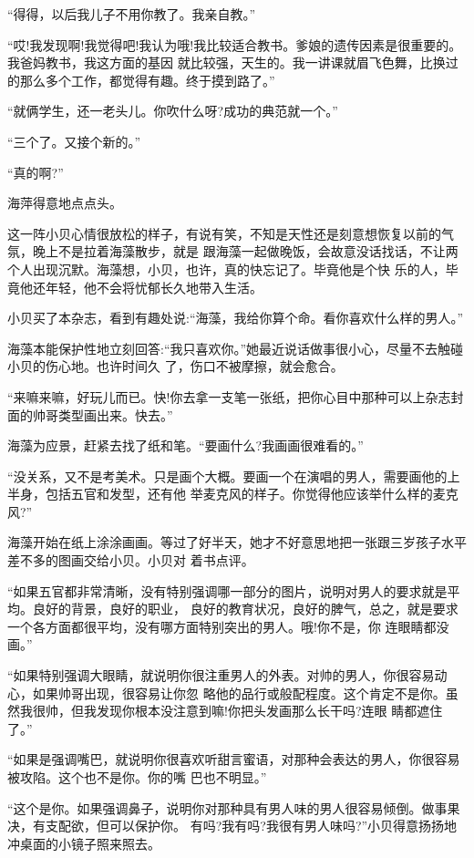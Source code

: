 \documentclass[11pt,a4paper,onecolumn]{article}
\begin{document}
``得得，以后我儿子不用你教了。我亲自教。''

``哎!我发现啊!我觉得吧!我认为哦!我比较适合教书。爹娘的遗传因素是很重要的。我爸妈教书，我这方面的基因
就比较强，天生的。我一讲课就眉飞色舞，比换过的那么多个工作，都觉得有趣。终于摸到路了。''

``就俩学生，还一老头儿。你吹什么呀?成功的典范就一个。''

``三个了。又接个新的。''

``真的啊?''

海萍得意地点点头。

这一阵小贝心情很放松的样子，有说有笑，不知是天性还是刻意想恢复以前的气氛，晚上不是拉着海藻散步，就是
跟海藻一起做晚饭，会故意没话找话，不让两个人出现沉默。海藻想，小贝，也许，真的快忘记了。毕竟他是个快
乐的人，毕竟他还年轻，他不会将忧郁长久地带入生活。

小贝买了本杂志，看到有趣处说:``海藻，我给你算个命。看你喜欢什么样的男人。''

海藻本能保护性地立刻回答:``我只喜欢你。''她最近说话做事很小心，尽量不去触碰小贝的伤心地。也许时间久
了，伤口不被摩擦，就会愈合。

``来嘛来嘛，好玩儿而已。快!你去拿一支笔一张纸，把你心目中那种可以上杂志封面的帅哥类型画出来。快去。''

海藻为应景，赶紧去找了纸和笔。``要画什么?我画画很难看的。''

``没关系，又不是考美术。只是画个大概。要画一个在演唱的男人，需要画他的上半身，包括五官和发型，还有他
举麦克风的样子。你觉得他应该举什么样的麦克风?''

海藻开始在纸上涂涂画画。等过了好半天，她才不好意思地把一张跟三岁孩子水平差不多的图画交给小贝。小贝对
着书点评。

``如果五官都非常清晰，没有特别强调哪一部分的图片，说明对男人的要求就是平均。良好的背景，良好的职业，
良好的教育状况，良好的脾气，总之，就是要求一个各方面都很平均，没有哪方面特别突出的男人。哦!你不是，你
连眼睛都没画。''

``如果特别强调大眼睛，就说明你很注重男人的外表。对帅的男人，你很容易动心，如果帅哥出现，很容易让你忽
略他的品行或般配程度。这个肯定不是你。虽然我很帅，但我发现你根本没注意到嘛!你把头发画那么长干吗?连眼
睛都遮住了。''

``如果是强调嘴巴，就说明你很喜欢听甜言蜜语，对那种会表达的男人，你很容易被攻陷。这个也不是你。你的嘴
巴也不明显。''

``这个是你。如果强调鼻子，说明你对那种具有男人味的男人很容易倾倒。做事果决，有支配欲，但可以保护你。
有吗?我有吗?我很有男人味吗?''小贝得意扬扬地冲桌面的小镜子照来照去。
\end{document}
